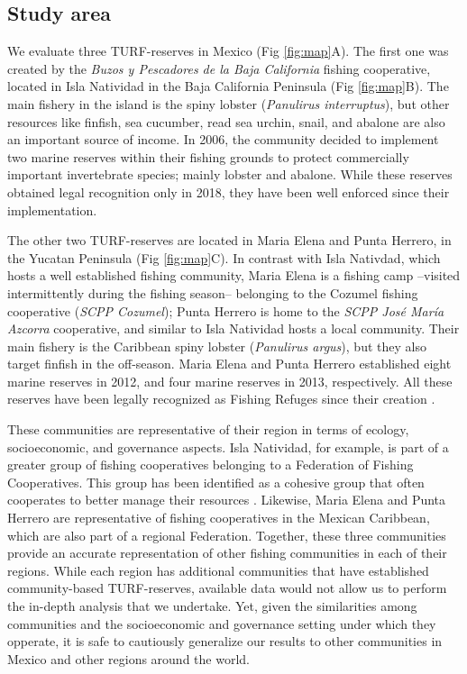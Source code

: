 \documentclass{frontiersSCNS}
\theoremstyle{definition}
\theoremstyle{definition}
\theoremstyle{definition}
\theoremstyle{remark}
\begin{document}
\subsection{Study area}\label{study-area}

We evaluate three TURF-reserves in Mexico (Fig \ref{fig:map}A). The
first one was created by the \emph{Buzos y Pescadores de la Baja
California} fishing cooperative, located in Isla Natividad in the Baja
California Peninsula (Fig \ref{fig:map}B). The main fishery in the
island is the spiny lobster (\emph{Panulirus interruptus}), but other
resources like finfish, sea cucumber, read sea urchin, snail, and
abalone are also an important source of income. In 2006, the community
decided to implement two marine reserves within their fishing grounds to
protect commercially important invertebrate species; mainly lobster and
abalone. While these reserves obtained legal recognition only in 2018,
they have been well enforced since their implementation.

The other two TURF-reserves are located in Maria Elena and Punta
Herrero, in the Yucatan Peninsula (Fig \ref{fig:map}C). In contrast with
Isla Nativdad, which hosts a well established fishing community, Maria
Elena is a fishing camp --visited intermittently during the fishing
season-- belonging to the Cozumel fishing cooperative (\emph{SCPP
Cozumel}); Punta Herrero is home to the \emph{SCPP José María Azcorra}
cooperative, and similar to Isla Natividad hosts a local community.
Their main fishery is the Caribbean spiny lobster (\emph{Panulirus
argus}), but they also target finfish in the off-season. Maria Elena and
Punta Herrero established eight marine reserves in 2012, and four marine
reserves in 2013, respectively. All these reserves have been legally
recognized as Fishing Refuges since their creation
\citep{dof_website_2012,dof_website_2013}.

These communities are representative of their region in terms of
ecology, socioeconomic, and governance aspects. Isla Natividad, for
example, is part of a greater group of fishing cooperatives belonging to
a Federation of Fishing Cooperatives. This group has been identified as
a cohesive group that often cooperates to better manage their resources
\citep{mccay_2017-1m,mccay_2014-CN,acevesbueno_2017}. Likewise, Maria
Elena and Punta Herrero are representative of fishing cooperatives in
the Mexican Caribbean, which are also part of a regional Federation.
Together, these three communities provide an accurate representation of
other fishing communities in each of their regions. While each region
has additional communities that have established community-based
TURF-reserves, available data would not allow us to perform the in-depth
analysis that we undertake. Yet, given the similarities among
communities and the socioeconomic and governance setting under which
they opperate, it is safe to cautiously generalize our results to other
communities in Mexico and other regions around the world.
\end{document}
